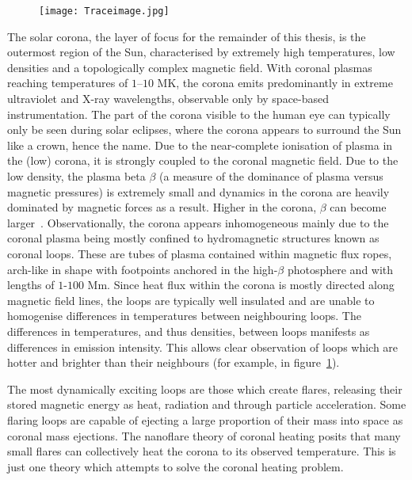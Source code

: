 \begin{figure}[t]
  \centering
  \texttt{[image: Traceimage.jpg]}
  \label{fig:coronal_loops}
\end{figure}

The solar corona, the layer of focus for the remainder of this thesis, is the outermost region of the Sun, characterised by extremely high temperatures, low densities and a topologically complex magnetic field. With coronal plasmas reaching temperatures of $1$--$10$ MK, the corona emits predominantly in extreme ultraviolet and X-ray wavelengths, observable only by space-based instrumentation. The part of the corona visible to the human eye can typically only be seen during solar eclipses, where the corona appears to surround the Sun like a crown, hence the name. Due to the near-complete ionisation of plasma in the (low) corona, it is strongly coupled to the coronal magnetic field. Due to the low density, the plasma beta $\beta$ (a measure of the dominance of plasma versus magnetic pressures) is extremely small and dynamics in the corona are heavily dominated by magnetic forces as a result. Higher in the corona, $\beta$ can become larger~\cite{gomezPlasmaUpbetaEvolution2019}. Observationally, the corona appears inhomogeneous mainly due to the coronal plasma being mostly confined to hydromagnetic structures known as coronal loops. These are tubes of plasma contained within magnetic flux ropes, arch-like in shape with footpoints anchored in the high-$\beta$ photosphere and with lengths of $1$-$100$ Mm. Since heat flux within the corona is mostly directed along magnetic field lines, the loops are typically well insulated and are unable to homogenise differences in temperatures between neighbouring loops. The differences in temperatures, and thus densities, between loops manifests as differences in emission intensity. This allows clear observation of loops which are hotter and brighter than their neighbours (for example, in figure~\ref{fig:coronal_loops}).

The most dynamically exciting loops are those which create flares, releasing their stored magnetic energy as heat, radiation and through particle acceleration. Some flaring loops are capable of ejecting a large proportion of their mass into space as coronal mass ejections. The nanoflare theory of coronal heating posits that many small flares can collectively heat the corona to its observed temperature. This is just one theory which attempts to solve the coronal heating problem.

